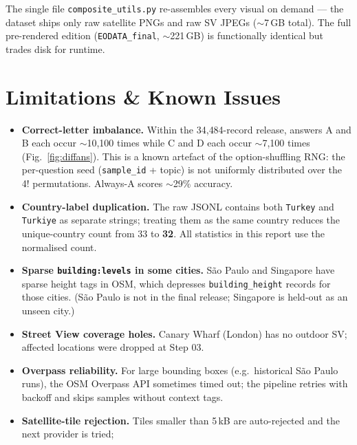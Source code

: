 \documentclass[11pt,a4paper]{article}
\begin{document}
\noindent The single file \texttt{composite\_utils.py} re-assembles every
visual on demand --- the dataset ships only raw satellite PNGs and
raw SV JPEGs ($\sim$7\,GB total). The full pre-rendered edition
(\texttt{EODATA\_final}, $\sim$221\,GB) is functionally identical but
trades disk for runtime.

\section{Limitations \& Known Issues}
\label{sec:limits}

\begin{itemize}[itemsep=3pt]
  \item \textbf{Correct-letter imbalance.} Within the 34{,}484-record
        release, answers A and B each occur $\sim$10{,}100 times while
        C and D each occur $\sim$7{,}100 times (Fig.~\ref{fig:diffans}).
        This is a known artefact of the option-shuffling RNG: the
        per-question seed (\texttt{sample\_id} + topic) is not
        uniformly distributed over the 4! permutations. Always-A
        scores $\sim$29\% accuracy.
  \item \textbf{Country-label duplication.} The raw JSONL contains
        both \texttt{Turkey} and \texttt{Turkiye} as separate strings;
        treating them as the same country reduces the unique-country
        count from 33 to \textbf{32}. All statistics in this report
        use the normalised count.
  \item \textbf{Sparse \texttt{building:levels} in some cities.}
        São Paulo and Singapore have sparse height tags in OSM,
        which depresses \texttt{building\_height} records for those
        cities. (São Paulo is not in the final release; Singapore is
        held-out as an unseen city.)
  \item \textbf{Street View coverage holes.} Canary Wharf
        (London) has no outdoor SV; affected locations were dropped
        at Step 03.
  \item \textbf{Overpass reliability.} For large bounding boxes
        (e.g.\ historical São Paulo runs), the OSM Overpass API
        sometimes timed out; the pipeline retries with backoff and
        skips samples without context tags.
  \item \textbf{Satellite-tile rejection.} Tiles smaller than
        5\,kB are auto-rejected and the next provider is tried;

\end{itemize}
\end{document}
